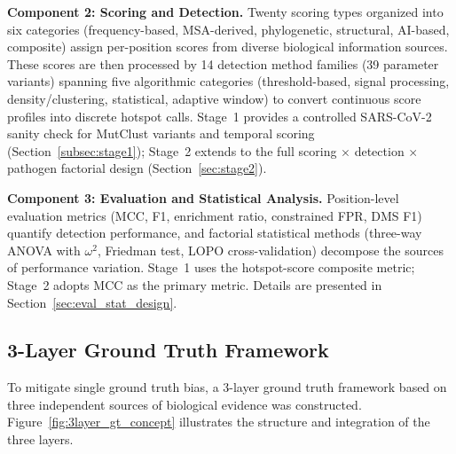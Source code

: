 \textbf{Component 2: Scoring and Detection.}
Twenty scoring types organized into six categories (frequency-based, MSA-derived, phylogenetic, structural, AI-based, composite) assign per-position scores from diverse biological information sources.
These scores are then processed by 14 detection method families (39 parameter variants) spanning five algorithmic categories (threshold-based, signal processing, density/clustering, statistical, adaptive window) to convert continuous score profiles into discrete hotspot calls.
Stage~1 provides a controlled SARS-CoV-2 sanity check for MutClust variants and temporal scoring (Section~\ref{subsec:stage1}); Stage~2 extends to the full scoring $\times$ detection $\times$ pathogen factorial design (Section~\ref{sec:stage2}).

\textbf{Component 3: Evaluation and Statistical Analysis.}
Position-level evaluation metrics (MCC, F1, enrichment ratio, constrained FPR, DMS F1) quantify detection performance, and factorial statistical methods (three-way ANOVA with $\omega^2$, Friedman test, LOPO cross-validation) decompose the sources of performance variation.
Stage~1 uses the hotspot-score composite metric; Stage~2 adopts MCC as the primary metric.
Details are presented in Section~\ref{sec:eval_stat_design}.

\subsection{3-Layer Ground Truth Framework}
\label{subsec:3layer_gt}

To mitigate single ground truth bias, a 3-layer ground truth framework based on three independent sources of biological evidence was constructed.
Figure~\ref{fig:3layer_gt_concept} illustrates the structure and integration of the three layers.

